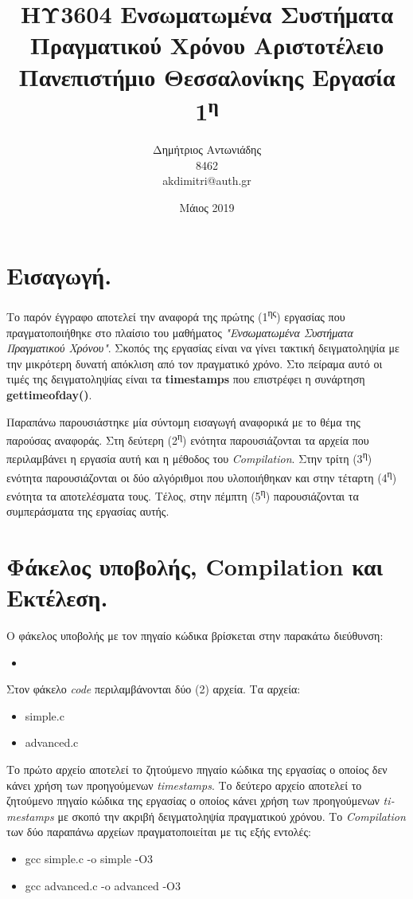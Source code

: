 \documentclass[12pt, a4paper]{article}
\title{{ΗΥ3604 Ενσωματωμένα Συστήματα Πραγματικού Χρόνου}\newline
{\large Αριστοτέλειο Πανεπιστήμιο Θεσσαλονίκης}\newline
{Εργασία 1\textsuperscript{η}}}
\author{Δημήτριος Αντωνιάδης\\
8462
\\\textlatin{akdimitri@auth.gr}}
\date{Μάιος 2019}
\begin{document}
\maketitle
\pagebreak
\tableofcontents
\pagebreak
\section{Εισαγωγή.}
\justify
Το παρόν έγγραφο αποτελεί την αναφορά της πρώτης (1\textsuperscript{ης}) εργασίας που πραγματοποιήθηκε στο πλαίσιο του μαθήματος \textit{"Ενσωματωμένα Συστήματα Πραγματικού Χρόνου"}. Σκοπός της εργασίας είναι να γίνει τακτική δειγματοληψία με την μικρότερη δυνατή απόκλιση από τον
πραγματικό χρόνο. Στο πείραμα αυτό οι τιμές της δειγματοληψίας είναι τα \textlatin{\textbf{timestamps}} που επιστρέφει η συνάρτηση \textlatin{\textbf{gettimeofday()}}\cite{manual}.

\justify
Παραπάνω παρουσιάστηκε μία σύντομη εισαγωγή αναφορικά με το θέμα της παρούσας αναφοράς. Στη δεύτερη (2\textsuperscript{η}) ενότητα παρουσιάζονται τα αρχεία που περιλαμβάνει η εργασία αυτή και η μέθοδος του \textit{\textlatin{Compilation}}. Στην τρίτη (3\textsuperscript{η}) ενότητα παρουσιάζονται οι δύο αλγόριθμοι που υλοποιήθηκαν και στην τέταρτη (4\textsuperscript{η}) ενότητα τα αποτελέσματα τους. Τέλος, στην πέμπτη (5\textsuperscript{η}) παρουσιάζονται τα συμπεράσματα της εργασίας αυτής.


\section{Φάκελος υποβολής, \textlatin{Compilation} και Εκτέλεση.}
Ο φάκελος υποβολής με τον πηγαίο κώδικα βρίσκεται στην παρακάτω διεύθυνση:
\begin{itemize}
  \item \textlatin{}
\end{itemize}
Στον φάκελο \textit{\textlatin{code}} περιλαμβάνονται δύο (2) αρχεία. Τα αρχεία:
\begin{itemize}
  \item \textlatin{simple.c}
  \item \textlatin{advanced.c}
\end{itemize}
\justify
Το πρώτο αρχείο αποτελεί το ζητούμενο πηγαίο κώδικα της εργασίας ο οποίος δεν κάνει χρήση των προηγούμενων
\textit{\textlatin{timestamps}}. Το δεύτερο αρχείο αποτελεί το ζητούμενο πηγαίο κώδικα της εργασίας ο οποίος κάνει χρήση των προηγούμενων \textit{\textlatin{timestamps}} με σκοπό την ακριβή δειγματοληψία πραγματικού χρόνου.
\justify
Το \textit{\textlatin{Compilation}} των δύο παραπάνω αρχείων πραγματοποιείται με τις εξής εντολές:
\begin{itemize}
  \item \textlatin{gcc simple.c -o simple -O3}
  \item \textlatin{gcc advanced.c -o advanced -O3}
\end{itemize}
\end{document}

